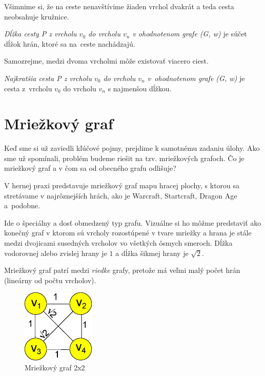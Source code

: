 Všimnime si, že na ceste nenavštívime žiaden vrchol dvakrát a teda cesta neobsahuje kružnice.


\begin{define}
{\sl Dĺžka cesty P z vrcholu $v_0$ do vrcholu $v_n$ v ohodnotenom grafe (G, w) } je súčet dĺžok hrán, ktoré sa na~ceste nachádzajú.
\end{define}

Samozrejme, medzi dvoma vrcholmi môže existovať viacero ciest.

\begin{define}
{\sl Najkratšia cesta P z vrcholu $v_0$ do vrcholu $v_n$
v~ohodnotenom grafe (G, w)} 
je cesta z~vrcholu $v_0$ do vrcholu $v_n$ s najmenšou dĺžkou. 
\end{define}


\section{Mriežkový graf}

Keď sme si už zaviedli kľúčové pojmy, prejdime k samotnému
zadaniu úlohy.
Ako sme už spomínali, problém budeme riešit na tzv. mriežkových grafoch. Čo je mriežkový graf a v čom sa od obecného grafu odlišuje?

V hernej praxi predstavuje mriežkový graf mapu hracej plochy, s ktorou sa stretávame v najrôznejších hrách, ako je Warcraft, Startcraft, Dragon Age \cite{sturtevant2012benchmarks}
a~podobne.

Ide o špeciálny a dosť obmedzený typ grafu. Vizuálne si ho môžme predstaviť ako konečný graf v ktorom sú vrcholy rozostúpené v tvare mriežky a hrana
je stále medzi dvojicami susedných vrcholov vo všetkých ôsmych smeroch. Dĺžka vodorovnej alebo zvislej hrany je $1$ a dĺžka šikmej hrany je $\sqrt{2}$.

\begin{note}
Mriežkový graf patrí medzi {\sl riedke} grafy,
pretože má veľmi malý počet hrán (lineárny od počtu vrcholov).
\end{note}


\begin{figure}[h]
\centering
\includegraphics[height=3.5cm]{./img/mriezkovy_graf2x2.eps}
\caption{Mriežkový graf 2x2}
\label{fig:mriezkovy_graf2x2}
\end{figure}



